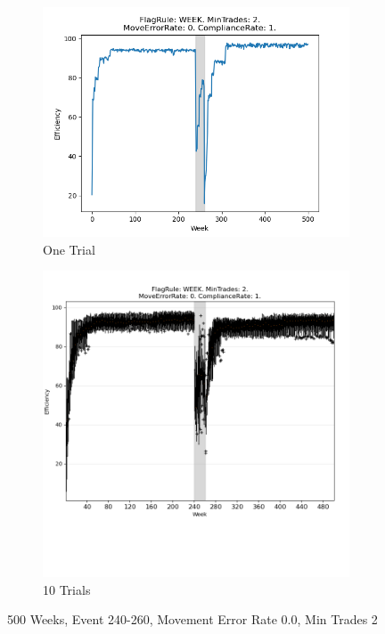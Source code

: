 \documentclass{article}%
\begin{document}
%


\begin{figure}[!htb]%
\begin{subfigure}[b]{0.45\linewidth}%
\includegraphics[width=\linewidth]{2029fr_WEEK_mt_2_er_0_cr_1_t1.png}%
\caption{One Trial}%
\end{subfigure}%
\begin{subfigure}[b]{0.45\linewidth}%
\includegraphics[clip,width=\linewidth,trim=0 4cm 0 0]{2029fr_WEEK_mt_2_er_0_cr_1_t10.png}%
\caption{10 Trials}%
\end{subfigure}%
\caption{500 Weeks, Event 240{-}260, Movement Error Rate 0.0, Min Trades 2}%
\end{figure}
\end{document}
